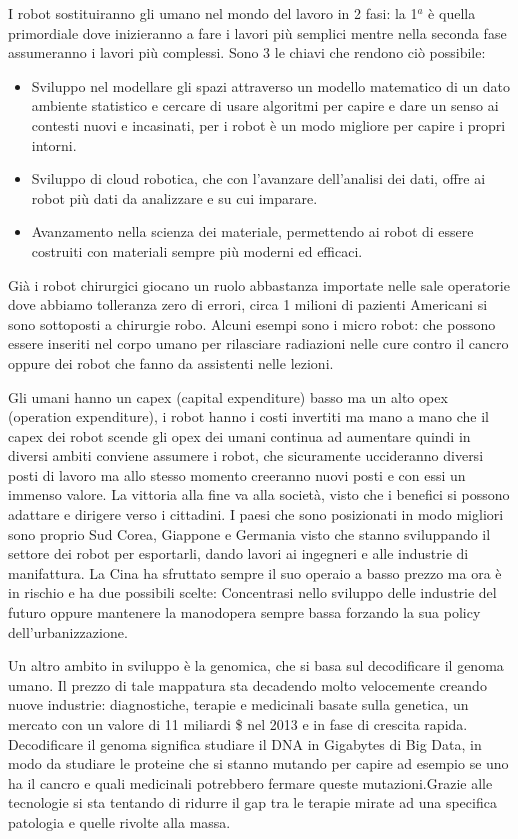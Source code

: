 \documentclass[a4page, 11pt]{article}
\begin{document}
I robot sostituiranno gli umano nel mondo del lavoro in 2 fasi: la 1$^a$ è
quella primordiale dove inizieranno a fare i lavori più semplici mentre
nella seconda fase assumeranno i lavori più complessi. Sono 3 le chiavi
che rendono ciò possibile:

\begin{itemize}
	 
	\item
	Sviluppo nel modellare gli spazi attraverso un modello matematico di
	un dato ambiente statistico e cercare di usare algoritmi per capire e
	dare un senso ai contesti nuovi e incasinati, per i robot è un modo
	migliore per capire i propri intorni.
	\item
	Sviluppo di cloud robotica, che con l'avanzare dell'analisi dei dati,
	offre ai robot più dati da analizzare e su cui imparare.
	\item
	Avanzamento nella scienza dei materiale, permettendo ai robot di
	essere costruiti con materiali sempre più moderni ed efficaci.
\end{itemize}

Già i robot chirurgici giocano un ruolo abbastanza importate nelle sale
operatorie dove abbiamo tolleranza zero di errori, circa 1 milioni di
pazienti Americani si sono sottoposti a chirurgie robo. Alcuni esempi
sono i micro robot: che possono essere inseriti nel corpo umano per
rilasciare radiazioni nelle cure contro il cancro oppure dei robot che
fanno da assistenti nelle lezioni.

Gli umani hanno un capex (capital expenditure) basso ma un alto opex
(operation expenditure), i robot hanno i costi invertiti ma mano a mano
che il capex dei robot scende gli opex dei umani continua ad aumentare
quindi in diversi ambiti conviene assumere i robot, che sicuramente
uccideranno diversi posti di lavoro ma allo stesso momento creeranno
nuovi posti e con essi un immenso valore. La vittoria alla fine va alla
società, visto che i benefici si possono adattare e dirigere verso i
cittadini. I paesi che sono posizionati in modo migliori sono proprio
Sud Corea, Giappone e Germania visto che stanno sviluppando il settore
dei robot per esportarli, dando lavori ai ingegneri e alle industrie di
manifattura. La Cina ha sfruttato sempre il suo operaio a basso prezzo
ma ora è in rischio e ha due possibili scelte: Concentrasi nello
sviluppo delle industrie del futuro oppure mantenere la manodopera
sempre bassa forzando la sua policy dell'urbanizzazione.

Un altro ambito in sviluppo è la genomica, che si basa sul decodificare
il genoma umano. Il prezzo di tale mappatura sta decadendo molto
velocemente creando nuove industrie: diagnostiche, terapie e medicinali
basate sulla genetica, un mercato con un valore di 11 miliardi \$ nel
2013 e in fase di crescita rapida. Decodificare il genoma significa
studiare il DNA in Gigabytes di Big Data, in modo da studiare le
proteine che si stanno mutando per capire ad esempio se uno ha il cancro
e quali medicinali potrebbero fermare queste mutazioni.Grazie alle 
tecnologie si sta tentando di ridurre il gap tra le terapie mirate
ad una specifica patologia e quelle rivolte alla massa.
\end{document}
